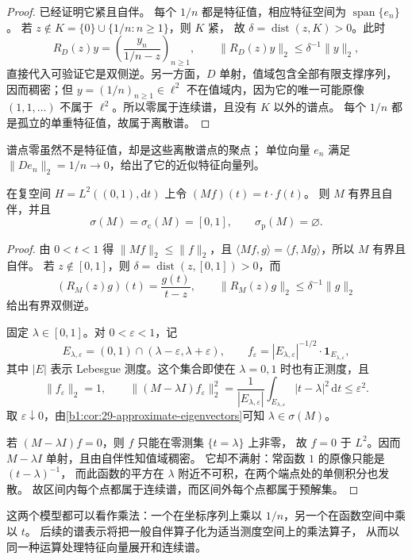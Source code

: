 \begin{proof}
已经证明它紧且自伴。
每个 \(1/n\) 都是特征值，相应特征空间为 \(\operatorname{span}\{e_n\}\)。
若 \(z\notin K=\{0\}\cup\{1/n:n\geq1\}\)，则 \(K\) 紧，
故 \(\delta=\operatorname{dist}(z,K)>0\)。此时
\[
 R_D(z)y=\left(\frac{y_n}{1/n-z}\right)_{n\geq1},\qquad
 \|R_D(z)y\|_2\leq\delta^{-1}\|y\|_2,
\]
直接代入可验证它是双侧逆。另一方面，\(D\) 单射，值域包含全部有限支撑序列，
因而稠密；但 \(y=(1/n)_{n\geq1}\in\ell^2\) 不在值域内，因为它的唯一可能原像
\((1,1,\ldots)\) 不属于 \(\ell^2\)。所以零属于连续谱，且没有 \(K\) 以外的谱点。
每个 \(1/n\) 都是孤立的单重特征值，故属于离散谱。
\end{proof}

谱点零虽然不是特征值，却是这些离散谱点的聚点；
单位向量 \(e_n\) 满足 \(\|De_n\|_2=1/n\to0\)，给出了它的近似特征向量列。

\begin{proposition}[区间上的乘法算子]
\label{b1:examp:29-multiplication-spectrum}
在复空间 \(H=L^2((0,1),\mathrm{d}t)\) 上令 \((Mf)(t)=t\cdot f(t)\)。
则 \(M\) 有界且自伴，并且
\[
 \sigma(M)=\sigma_{\mathrm c}(M)=[0,1],\qquad
 \sigma_{\mathrm p}(M)=\varnothing.
\]
\end{proposition}

\begin{proof}
由 \(0<t<1\) 得 \(\|Mf\|_2\leq\|f\|_2\)，且
\(\langle Mf,g\rangle=\langle f,Mg\rangle\)，所以 \(M\) 有界且自伴。
若 \(z\notin[0,1]\)，则 \(\delta=\operatorname{dist}(z,[0,1])>0\)，而
\[
 (R_M(z)g)(t)=\frac{g(t)}{t-z},\qquad
 \|R_M(z)g\|_2\leq\delta^{-1}\|g\|_2
\]
给出有界双侧逆。

固定 \(\lambda\in[0,1]\)。对 \(0<\varepsilon<1\)，记
\[
 E_{\lambda,\varepsilon}=(0,1)\cap(\lambda-\varepsilon,\lambda+\varepsilon),
 \qquad
 f_\varepsilon=|E_{\lambda,\varepsilon}|^{-1/2}\cdot\mathbf1_{E_{\lambda,\varepsilon}},
\]
其中 \(|E|\) 表示 Lebesgue 测度。这个集合即使在 \(\lambda=0,1\) 时也有正测度，且
\[
 \|f_\varepsilon\|_2=1,\qquad
 \|(M-\lambda I)f_\varepsilon\|_2^2
 =\frac1{|E_{\lambda,\varepsilon}|}
   \int_{E_{\lambda,\varepsilon}}|t-\lambda|^2\,\mathrm{d}t
 \leq\varepsilon^2.
\]
取 \(\varepsilon\downarrow0\)，由\cref{b1:cor:29-approximate-eigenvectors}可知
\(\lambda\in\sigma(M)\)。

若 \((M-\lambda I)f=0\)，则 \(f\) 只能在零测集 \(\{t=\lambda\}\) 上非零，
故 \(f=0\) 于 \(L^2\)。因而 \(M-\lambda I\) 单射，且由自伴性知值域稠密。
它却不满射：常函数 \(1\) 的原像只能是 \((t-\lambda)^{-1}\)，
而此函数的平方在 \(\lambda\) 附近不可积，在两个端点处的单侧积分也发散。
故区间内每个点都属于连续谱，而区间外每个点都属于预解集。
\end{proof}

这两个模型都可以看作乘法：一个在坐标序列上乘以 \(1/n\)，另一个在函数空间中乘以 \(t\)。
后续的谱表示将把一般自伴算子化为适当测度空间上的乘法算子，
从而以同一种运算处理特征向量展开和连续谱。
